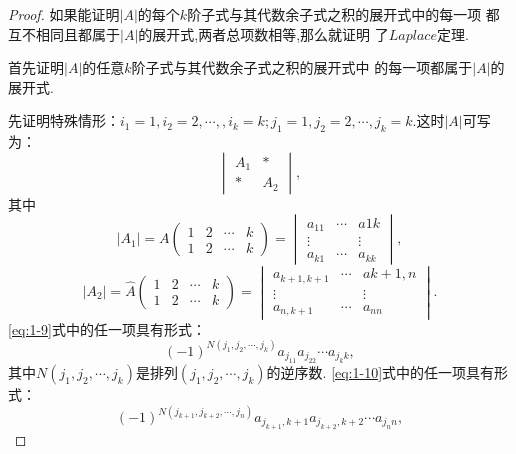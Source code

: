 \begin{proof}
  如果能证明$|A|$的每个$k$阶子式与其代数余子式之积的展开式中的每一项
  都互不相同且都属于$|A|$的展开式,两者总项数相等,那么就证明
  了$Laplace$定理.

  首先证明$|A|$的任意$k$阶子式与其代数余子式之积的展开式中
  的每一项都属于$|A|$的展开式.

  先证明特殊情形：$i_1=1,i_2=2,\cdots,
  ,i_k=k;j_1=1,j_2=2,\cdots,j_k=k$.这时$|A|$可写为：
  \begin{equation}
    \label{eq:1-8}
    \begin{vmatrix}
      A_1 & *\\
      * & A_2
    \end{vmatrix},
  \end{equation}
  其中
  \begin{equation}
    \label{eq:1-9}
    |A_1|=A
    \left(\begin{smallmatrix}
      1 & 2 & \cdots & k\\
      1 & 2 & \cdots & k
    \end{smallmatrix}\right)=
    \begin{vmatrix}
      a_{11}& \cdots & a{1k}\\
      \vdots & & \vdots\\
      a_{k1}& \cdots & a_{kk}
    \end{vmatrix},
  \end{equation}
  \begin{equation}
    \label{eq:1-10}
    |A_2|=\widehat{A}
    \left(\begin{smallmatrix}
      1 & 2 & \cdots & k\\
      1 & 2 & \cdots & k
    \end{smallmatrix}\right)=
    \begin{vmatrix}
      a_{k+1,k+1}& \cdots & a{k+1,n}\\
      \vdots & & \vdots\\
      a_{n,k+1}& \cdots & a_{nn}
    \end{vmatrix}.
  \end{equation}
  \eqref{eq:1-9}式中的任一项具有形式：
  \begin{equation*}
    (-1)^{N(j_1,j_2,\cdots,j_k)}a_{j_11}a_{j_22}\cdots a_{j_kk},
  \end{equation*}
  其中$N(j_1,j_2,\cdots,j_k)$是排列$(j_1,j_2,\cdots,j_k)$的逆序数.
  \eqref{eq:1-10}式中的任一项具有形式：
  \begin{equation*}
    (-1)^{N(j_{k+1},j_{k+2},\cdots,j_n)}a_{j_{k+1},k+1}a_{j_{k+2},k+2}\cdots a_{j_nn},

\end{equation*}
\end{proof}
